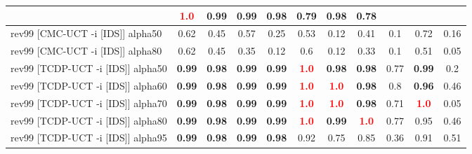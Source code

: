 \documentclass{article}
\begin{document}
\begin{tabular}{|l|r@{$\pm$}rr@{$\pm$}rr@{$\pm$}rr@{$\pm$}rr@{$\pm$}rr@{$\pm$}rr@{$\pm$}rr@{$\pm$}rr@{$\pm$}rr@{$\pm$}r|}
& \multicolumn{2}{c}{\textbf{\textcolor{red}{1.0}}}
& \multicolumn{2}{c}{0.99}
& \multicolumn{2}{c}{0.99}
& \multicolumn{2}{c}{0.98}
& \multicolumn{2}{c}{0.79}
& \multicolumn{2}{c}{0.98}
& \multicolumn{2}{c|}{0.78}
\\
\hline
rev99 [CMC-UCT -i [IDS]] alpha50
& \multicolumn{2}{c}{0.62}
& \multicolumn{2}{c}{0.45}
& \multicolumn{2}{c}{0.57}
& \multicolumn{2}{c}{0.25}
& \multicolumn{2}{c}{0.53}
& \multicolumn{2}{c}{0.12}
& \multicolumn{2}{c}{0.41}
& \multicolumn{2}{c}{0.1}
& \multicolumn{2}{c}{0.72}
& \multicolumn{2}{c|}{0.16}
\\
rev99 [CMC-UCT -i [IDS]] alpha80
& \multicolumn{2}{c}{0.62}
& \multicolumn{2}{c}{0.45}
& \multicolumn{2}{c}{0.35}
& \multicolumn{2}{c}{0.12}
& \multicolumn{2}{c}{0.6}
& \multicolumn{2}{c}{0.12}
& \multicolumn{2}{c}{0.33}
& \multicolumn{2}{c}{0.1}
& \multicolumn{2}{c}{0.51}
& \multicolumn{2}{c|}{0.05}
\\
rev99 [TCDP-UCT -i [IDS]] alpha50
& \multicolumn{2}{c}{\textbf{0.99}}
& \multicolumn{2}{c}{\textbf{0.98}}
& \multicolumn{2}{c}{\textbf{0.99}}
& \multicolumn{2}{c}{\textbf{0.99}}
& \multicolumn{2}{c}{\textbf{\textcolor{red}{1.0}}}
& \multicolumn{2}{c}{\textbf{0.98}}
& \multicolumn{2}{c}{\textbf{0.98}}
& \multicolumn{2}{c}{0.77}
& \multicolumn{2}{c}{\textbf{0.99}}
& \multicolumn{2}{c|}{0.2}
\\
rev99 [TCDP-UCT -i [IDS]] alpha60
& \multicolumn{2}{c}{\textbf{0.99}}
& \multicolumn{2}{c}{\textbf{0.98}}
& \multicolumn{2}{c}{\textbf{0.99}}
& \multicolumn{2}{c}{\textbf{0.99}}
& \multicolumn{2}{c}{\textbf{\textcolor{red}{1.0}}}
& \multicolumn{2}{c}{\textbf{\textcolor{red}{1.0}}}
& \multicolumn{2}{c}{\textbf{0.98}}
& \multicolumn{2}{c}{0.8}
& \multicolumn{2}{c}{\textbf{0.96}}
& \multicolumn{2}{c|}{0.46}
\\
rev99 [TCDP-UCT -i [IDS]] alpha70
& \multicolumn{2}{c}{\textbf{0.99}}
& \multicolumn{2}{c}{\textbf{0.98}}
& \multicolumn{2}{c}{\textbf{0.99}}
& \multicolumn{2}{c}{\textbf{0.99}}
& \multicolumn{2}{c}{\textbf{\textcolor{red}{1.0}}}
& \multicolumn{2}{c}{\textbf{\textcolor{red}{1.0}}}
& \multicolumn{2}{c}{\textbf{0.98}}
& \multicolumn{2}{c}{0.71}
& \multicolumn{2}{c}{\textbf{\textcolor{red}{1.0}}}
& \multicolumn{2}{c|}{0.05}
\\
rev99 [TCDP-UCT -i [IDS]] alpha80
& \multicolumn{2}{c}{\textbf{0.99}}
& \multicolumn{2}{c}{\textbf{0.98}}
& \multicolumn{2}{c}{\textbf{0.99}}
& \multicolumn{2}{c}{\textbf{0.99}}
& \multicolumn{2}{c}{\textbf{\textcolor{red}{1.0}}}
& \multicolumn{2}{c}{\textbf{0.99}}
& \multicolumn{2}{c}{\textbf{\textcolor{red}{1.0}}}
& \multicolumn{2}{c}{0.77}
& \multicolumn{2}{c}{0.95}
& \multicolumn{2}{c|}{0.46}
\\
rev99 [TCDP-UCT -i [IDS]] alpha95
& \multicolumn{2}{c}{\textbf{0.99}}
& \multicolumn{2}{c}{\textbf{0.98}}
& \multicolumn{2}{c}{\textbf{0.99}}
& \multicolumn{2}{c}{\textbf{0.98}}
& \multicolumn{2}{c}{0.92}
& \multicolumn{2}{c}{0.75}
& \multicolumn{2}{c}{0.85}
& \multicolumn{2}{c}{0.36}
& \multicolumn{2}{c}{0.91}
& \multicolumn{2}{c|}{0.51}
\\
\hline
\end{tabular}%
\end{document}
